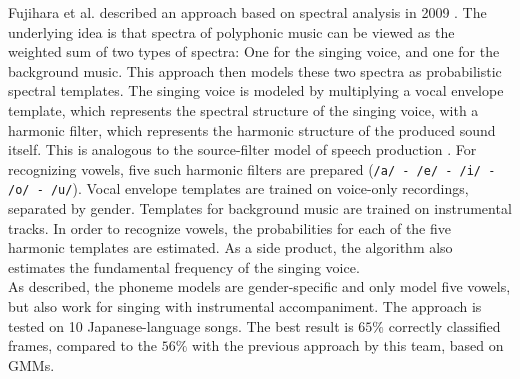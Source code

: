 Fujihara et al. described an approach based on spectral analysis in 2009 \cite{fujihara_phonemes}. The underlying idea is that spectra of polyphonic music can be viewed as the weighted sum of two types of spectra: One for the singing voice, and one for the background music. This approach then models these two spectra as probabilistic spectral templates. The singing voice is modeled by multiplying a vocal envelope template, which represents the spectral structure of the singing voice, with a harmonic filter, which represents the harmonic structure of the produced sound itself. This is analogous to the source-filter model of speech production \cite{Fant1981}. For recognizing vowels, five such harmonic filters are prepared (\texttt{/a/ - /e/ - /i/ - /o/ - /u/}). Vocal envelope templates are trained on voice-only recordings, separated by gender. Templates for background music are trained on instrumental tracks. In order to recognize vowels, the probabilities for each of the five harmonic templates are estimated. As a side product, the algorithm also estimates the fundamental frequency of the singing voice.\\
As described, the phoneme models are gender-specific and only model five vowels, but also work for singing with instrumental accompaniment. The approach is tested on 10 Japanese-language songs. The best result is $65\%$ correctly classified frames, compared to the $56\%$ with the previous approach by this team, based on GMMs. \\

